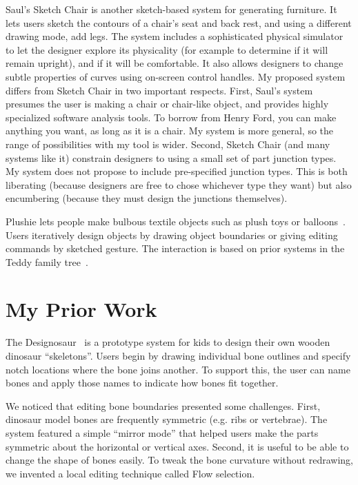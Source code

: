 \documentclass[11pt]{article}
\begin{document}
Saul's Sketch Chair \cite{saul-sketch-chair} is another sketch-based
system for generating furniture. It lets users sketch the contours of
a chair's seat and back rest, and using a different drawing mode, add
legs. The system includes a sophisticated physical simulator to let
the designer explore its physicality (for example to determine if it
will remain upright), and if it will be comfortable. It also allows
designers to change subtle properties of curves using on-screen control
handles. My proposed system differs from Sketch Chair in two important
respects. First, Saul's system presumes the user is making a chair or
chair-like object, and provides highly specialized software analysis
tools. To borrow from Henry Ford, you can make anything you want, as
long as it is a chair. My system is more general, so the range of
possibilities with my tool is wider. Second, Sketch Chair (and many
systems like it) constrain designers to using a small set of part
junction types. My system does not propose to include pre-specified
junction types. This is both liberating (because designers are free to
chose whichever type they want) but also encumbering (because they
must design the junctions themselves).

Plushie lets people make bulbous textile objects such as plush toys or
balloons~\cite{mori-plushie}. Users iteratively design objects by
drawing object boundaries or giving editing commands by sketched
gesture. The interaction is based on prior systems in the Teddy family
tree~\cite{igarashi-teddy}.

\section{My Prior Work}

The Designosaur~\cite{oh-fab} is a prototype system for kids to design
their own wooden dinosaur ``skeletons''. Users begin by drawing
individual bone outlines and specify notch locations where the bone
joins another. To support this, the user can name bones and apply
those names to indicate how bones fit together.

We noticed that editing bone boundaries presented some challenges.
First, dinosaur model bones are frequently symmetric (e.g. ribs or
vertebrae). The system featured a simple ``mirror mode'' that helped
users make the parts symmetric about the horizontal or vertical axes.
Second, it is useful to be able to change the shape of bones
easily. To tweak the bone curvature without redrawing, we invented a
local editing technique called Flow selection.
\end{document}
